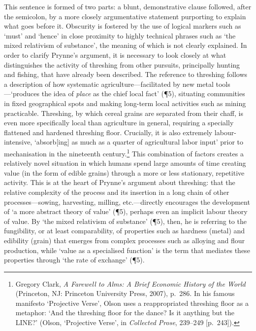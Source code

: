 \documentclass[]{article}
\begin{document}
This sentence is formed of two parts: a blunt, demonstrative clause
followed, after the semicolon, by a more closely argumentative statement
purporting to explain what goes before it. Obscurity is fostered by the
use of logical markers such as ‘must’ and ‘hence’ in close proximity to
highly technical phrases such as ‘the mixed relativism of substance’,
the meaning of which is not clearly explained. In order to clarify
Prynne’s argument, it is necessary to look closely at what distinguishes
the activity of threshing from other pursuits, principally hunting and
fishing, that have already been described. The reference to threshing
follows a description of how systematic agriculture—facilitated by new
metal tools—‘produces the idea of \emph{place} as the chief local fact’
(¶5), situating communities in fixed geographical spots and making
long-term local activities such as mining practicable. Threshing, by
which cereal grains are separated from their chaff, is even more
specifically local than agriculture in general, requiring a specially
flattened and hardened threshing floor. Crucially, it is also extremely
labour-intensive, ‘absorb{[}ing{]} as much as a quarter of agricultural
labor input’ prior to mechanisation in the nineteenth century.\footnote{Gregory
  Clark, \emph{A Farewell to Alms: A Brief Economic History of the
  World} (Princeton, NJ: Princeton University Press, 2007), p.~286. In
  his famous manifesto ‘Projective Verse’, Olson uses a reappropriated
  threshing floor as a metaphor: ‘And the threshing floor for the dance?
  Is it anything but the LINE?’ (Olson, ‘Projective Verse’, in
  \emph{Collected Prose}, 239–249 {[}p.~243{]}).} This combination of
factors creates a relatively novel situation in which humans spend large
amounts of time creating value (in the form of edible grains) through a
more or less stationary, repetitive activity. This is at the heart of
Prynne’s argument about threshing: that the relative complexity of the
process and its insertion in a long chain of other processes—sowing,
harvesting, milling, etc.—directly encourages the development of ‘a more
abstract theory of value’ (¶5), perhaps even an implicit labour theory
of value. By ‘the mixed relativism of substance’ (¶5), then, he is
referring to the fungibility, or at least comparability, of properties
such as hardness (metal) and edibility (grain) that emerges from complex
processes such as alloying and flour production, while ‘value as a
specialised function’ is the term that mediates these properties through
‘the rate of exchange’ (¶5).
\end{document}
